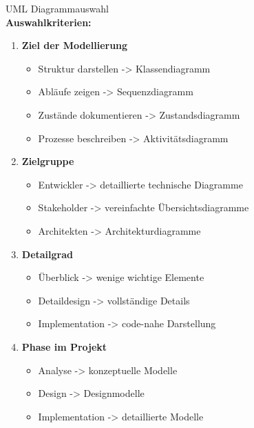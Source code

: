 \begin{KR}{UML Diagrammauswahl}\\
\textbf{Auswahlkriterien:}

\begin{enumerate}
    \item \textbf{Ziel der Modellierung}
    \begin{itemize}
        \item Struktur darstellen -> Klassendiagramm
        \item Abläufe zeigen -> Sequenzdiagramm
        \item Zustände dokumentieren -> Zustandsdiagramm
        \item Prozesse beschreiben -> Aktivitätsdiagramm
    \end{itemize}
    
    \item \textbf{Zielgruppe}
    \begin{itemize}
        \item Entwickler -> detaillierte technische Diagramme
        \item Stakeholder -> vereinfachte Übersichtsdiagramme
        \item Architekten -> Architekturdiagramme
    \end{itemize}
    
    \item \textbf{Detailgrad}
    \begin{itemize}
        \item Überblick -> wenige wichtige Elemente
        \item Detaildesign -> vollständige Details
        \item Implementation -> code-nahe Darstellung
    \end{itemize}
    
    \item \textbf{Phase im Projekt}
    \begin{itemize}
        \item Analyse -> konzeptuelle Modelle
        \item Design -> Designmodelle
        \item Implementation -> detaillierte Modelle
    \end{itemize}
\end{enumerate}
\end{KR}

